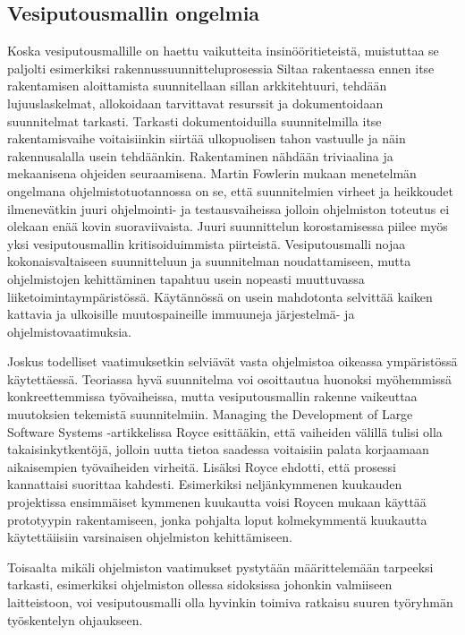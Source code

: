 \documentclass[finnish,12pt]{tktltiki2}
\theoremstyle{definition}
\theoremstyle{remark}
\begin{document}
\subsection{Vesiputousmallin ongelmia}

Koska vesiputousmallille on haettu vaikutteita insinööritieteistä, muistuttaa se paljolti esimerkiksi rakennussuunnitteluprosessia \cite{Sommerville10} Siltaa rakentaessa ennen itse rakentamisen aloittamista suunnitellaan sillan arkkitehtuuri, tehdään lujuuslaskelmat, allokoidaan tarvittavat resurssit ja dokumentoidaan suunnitelmat tarkasti. Tarkasti dokumentoiduilla suunnitelmilla itse rakentamisvaihe voitaisiinkin siirtää ulkopuolisen tahon vastuulle ja näin rakennusalalla usein tehdäänkin. \cite{Fowler05} Rakentaminen nähdään triviaalina ja mekaanisena ohjeiden seuraamisena. Martin Fowlerin mukaan menetelmän ongelmana ohjelmistotuotannossa on se, että suunnitelmien virheet ja heikkoudet ilmenevätkin juuri ohjelmointi- ja testausvaiheissa jolloin ohjelmiston toteutus ei olekaan enää kovin suoraviivaista. Juuri suunnittelun korostamisessa piilee myös yksi vesiputousmallin kritisoiduimmista piirteistä. Vesiputousmalli nojaa kokonaisvaltaiseen suunnitteluun ja suunnitelman noudattamiseen, mutta ohjelmistojen kehittäminen tapahtuu usein nopeasti muuttuvassa liiketoimintaympäristössä. Käytännössä on usein mahdotonta selvittää kaiken kattavia ja ulkoisille muutospaineille immuuneja järjestelmä- ja ohjelmistovaatimuksia. \cite{Sommerville10} 

Joskus todelliset vaatimuksetkin selviävät vasta ohjelmistoa oikeassa ympäristössä käytettäessä. Teoriassa hyvä suunnitelma voi osoittautua huonoksi myöhemmissä konkreettemmissa työvaiheissa, mutta vesiputousmallin rakenne vaikeuttaa muutoksien tekemistä suunnitelmiin. Managing the Development of Large Software Systems -artikkelissa Royce esittääkin, että vaiheiden välillä tulisi olla takaisinkytkentöjä, jolloin uutta tietoa saadessa voitaisiin palata korjaamaan aikaisempien työvaiheiden virheitä. \cite{Royce1970} Lisäksi Royce ehdotti, että prosessi kannattaisi suorittaa kahdesti. Esimerkiksi neljänkymmenen kuukauden projektissa ensimmäiset kymmenen kuukautta voisi Roycen mukaan käyttää prototyypin rakentamiseen, jonka pohjalta loput kolmekymmentä kuukautta käytettäiisiin varsinaisen ohjelmiston kehittämiseen.

Toisaalta mikäli ohjelmiston vaatimukset pystytään määrittelemään tarpeeksi tarkasti, esimerkiksi ohjelmiston ollessa sidoksissa johonkin valmiiseen laitteistoon, voi vesiputousmalli olla hyvinkin toimiva ratkaisu suuren työryhmän työskentelyn ohjaukseen.
\end{document}
